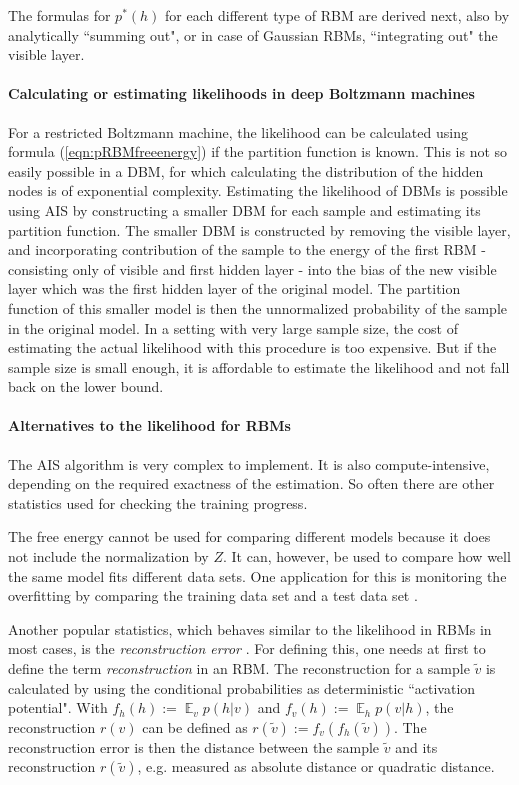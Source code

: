 \documentclass[12pt]{article}
\DeclareMathOperator{\EX}{\mathbb{E}}
\begin{document}
The formulas for $p^*(h)$ for each different type of RBM are derived next, also by analytically ``summing out", or in case of Gaussian RBMs, ``integrating out" the visible layer.




\paragraph{Calculating or estimating likelihoods in deep Boltzmann machines} %
For a restricted Boltzmann machine, the likelihood can be calculated using formula (\ref{eqn:pRBMfreeenergy}) if the partition function is known. This is not so easily possible in a DBM, for which calculating the distribution of the hidden nodes is of exponential complexity.
Estimating the likelihood of DBMs is possible using AIS by constructing a smaller DBM for each sample and estimating its partition function.
The smaller DBM is constructed by removing the visible layer, and incorporating contribution of the sample to the energy of the first RBM - consisting only of visible and first hidden layer - into the bias of the new visible layer which was the first hidden layer of the original model.
The partition function of this smaller model is then the unnormalized probability of the sample in the original model.
In a setting with very large sample size, the cost of estimating the actual likelihood with this procedure is too expensive. But if the sample size is small enough, it is affordable to estimate the likelihood and not fall back on the lower bound.

\paragraph{Alternatives to the likelihood for RBMs}
The AIS algorithm is very complex to implement.
It is also compute-intensive, depending on the required exactness of the estimation.
So often there are other statistics used for checking the training progress.

The free energy cannot be used for comparing different models because it does not include the normalization by $Z$.
It can, however, be used to compare how well the same model fits different data sets.
One application for this is monitoring the overfitting by comparing the training data set and a test data set \citep{hinton_practical_2012}.

Another popular statistics, which behaves similar to the likelihood in RBMs in most cases, is the {\em reconstruction error} \citep{hinton_practical_2012}.
For defining this, one needs at first to define the term {\em reconstruction} in an RBM.
The reconstruction \citep{hinton_practical_2012} for a sample $\widetilde{v}$ is calculated by using the conditional probabilities as deterministic ``activation potential".
With $f_h(h) := \EX_v p(h|v)$ and $f_v(h) := \EX_h p(v|h)$, the reconstruction $r(v)$ can be defined as $r(\widetilde{v}) := f_v(f_h(\widetilde{v}))$. The reconstruction error is then the distance between the sample $\widetilde{v}$ and its reconstruction $r(\widetilde{v})$, e.g. measured as absolute distance or quadratic distance.
\end{document}

